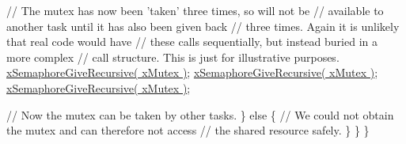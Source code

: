 \begin{DoxyPre}           // The mutex has now been 'taken' three times, so will not be
        // available to another task until it has also been given back
        // three times.  Again it is unlikely that real code would have
        // these calls sequentially, but instead buried in a more complex
        // call structure.  This is just for illustrative purposes.
           \hyperlink{vendor_2ceedling_2plugins_2freertos_2src_2freertos_2include_2semphr_8h_a398d66b17856c22dd49d39aaac42f105}{xSemaphoreGiveRecursive( xMutex )};
        \hyperlink{vendor_2ceedling_2plugins_2freertos_2src_2freertos_2include_2semphr_8h_a398d66b17856c22dd49d39aaac42f105}{xSemaphoreGiveRecursive( xMutex )};
        \hyperlink{vendor_2ceedling_2plugins_2freertos_2src_2freertos_2include_2semphr_8h_a398d66b17856c22dd49d39aaac42f105}{xSemaphoreGiveRecursive( xMutex )};\end{DoxyPre}



\begin{DoxyPre}        // Now the mutex can be taken by other tasks.
       \}
       else
       \{
           // We could not obtain the mutex and can therefore not access
           // the shared resource safely.
       \}
   \}
\}
\end{DoxyPre}
 